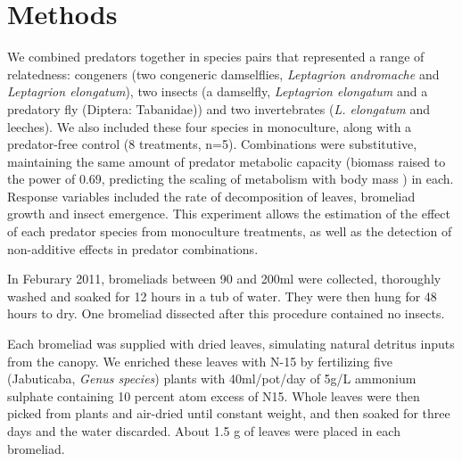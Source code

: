 \documentclass[10pt]{article}
\begin{document}




\section{Methods}



We combined predators together in species pairs that represented a
range of relatedness: congeners (two congeneric damselflies,
\emph{Leptagrion andromache} and \emph{Leptagrion elongatum}), two
insects (a damselfly, \emph{Leptagrion elongatum} and a predatory fly
(Diptera: Tabanidae)) and two invertebrates (\emph{L. elongatum} and
leeches).  We also included these four species in monoculture, along
with a predator-free control (8 treatments, n=5).  Combinations were
substitutive, maintaining the same amount of predator metabolic
capacity (biomass raised to the power of 0.69, predicting the scaling
of metabolism with body mass \citep{Brown2004}) in each.  Response
variables included the rate of decomposition of leaves, bromeliad
growth and insect emergence.  This experiment allows the estimation of
the effect of each predator species from monoculture treatments, as
well as the detection of non-additive effects in predator
combinations.

In Feburary 2011, bromeliads between 90 and 200ml were collected,
thoroughly washed and soaked for 12 hours in a tub of water.  They
were then hung for 48 hours to dry.  One bromeliad dissected after
this procedure contained no insects.

Each bromeliad was supplied with dried leaves, simulating natural
detritus inputs from the canopy.  We enriched these leaves with N-15
by fertilizing five (Jabuticaba, \emph{Genus species}) plants with
40ml/pot/day of 5g/L ammonium sulphate containing 10 percent atom
excess of N15. %
Whole leaves were then picked from plants and air-dried until constant
weight, and then soaked for three days and the water discarded.  About
1.5 g of leaves were placed in each bromeliad.
\end{document}
